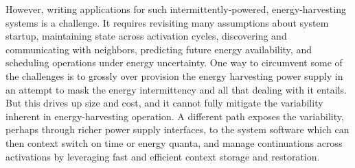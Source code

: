 However, writing applications for such intermittently-powered,
energy-harvesting systems is a challenge.  It requires revisiting many
assumptions about system startup, maintaining state across activation cycles,
discovering and communicating with neighbors, predicting future energy
availability, and scheduling operations under energy uncertainty.  One way to
circumvent some of the challenges is to grossly over provision the energy
harvesting power supply in an attempt to mask the energy intermittency and all
that dealing with it entails.  But this drives up size and cost, and it cannot
fully mitigate the variability inherent in energy-harvesting operation.  A
different path exposes the variability, perhaps through richer power supply
interfaces, to the system software which can then context switch on time or
energy quanta, and manage continuations across activations by leveraging fast
and efficient context storage and restoration.

